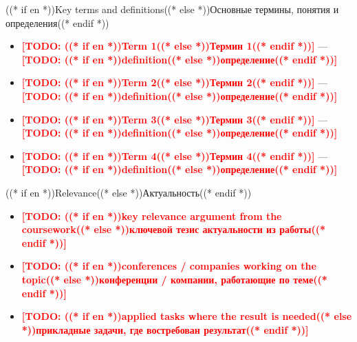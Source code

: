 \documentclass[aspectratio=169, 14pt]{beamer}
\newcommand{\todo}[1]{\textcolor{red}{\textbf{[TODO: #1]}}}
\begin{document}
\begin{frame}{((* if en *))Key terms and definitions((* else *))Основные термины, понятия и определения((* endif *))}
  \begin{itemize}
    \item \textbf{\todo{((* if en *))Term 1((* else *))Термин 1((* endif *))}} — \todo{((* if en *))definition((* else *))определение((* endif *))}
    \item \textbf{\todo{((* if en *))Term 2((* else *))Термин 2((* endif *))}} — \todo{((* if en *))definition((* else *))определение((* endif *))}
    \item \textbf{\todo{((* if en *))Term 3((* else *))Термин 3((* endif *))}} — \todo{((* if en *))definition((* else *))определение((* endif *))}
    \item \textbf{\todo{((* if en *))Term 4((* else *))Термин 4((* endif *))}} — \todo{((* if en *))definition((* else *))определение((* endif *))}
  \end{itemize}
\end{frame}

\begin{frame}{((* if en *))Relevance((* else *))Актуальность((* endif *))}
  \begin{itemize}
    \item \todo{((* if en *))key relevance argument from the coursework((* else *))ключевой тезис актуальности из работы((* endif *))}
    \item \todo{((* if en *))conferences / companies working on the topic((* else *))конференции / компании, работающие по теме((* endif *))}
    \item \todo{((* if en *))applied tasks where the result is needed((* else *))прикладные задачи, где востребован результат((* endif *))}
  \end{itemize}
\end{frame}
\end{document}
